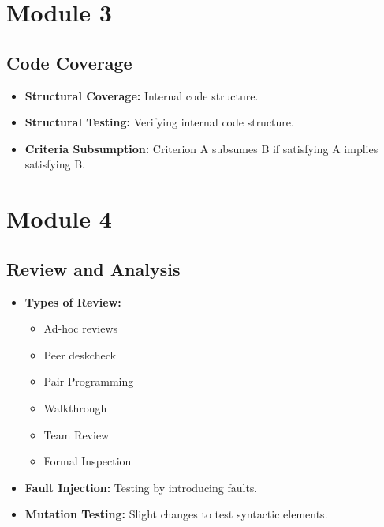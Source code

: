 \documentclass[10pt,portrait]{article}
\begin{document}
\begin{multicols}{ 2 }
\section*{Module 3}

\subsection*{Code Coverage}
\begin{itemize}
    \item \textbf{Structural Coverage:} Internal code structure.
    \item \textbf{Structural Testing:} Verifying internal code structure.
    \item \textbf{Criteria Subsumption:} Criterion A subsumes B if satisfying A implies satisfying B.
\end{itemize}

\section*{Module 4}

\subsection*{Review and Analysis}
\begin{itemize}
    \item \textbf{Types of Review:}
    \begin{itemize}
        \item Ad-hoc reviews
        \item Peer deskcheck
        \item Pair Programming
        \item Walkthrough
        \item Team Review
        \item Formal Inspection
    \end{itemize}
    \item \textbf{Fault Injection:} Testing by introducing faults.
    \item \textbf{Mutation Testing:} Slight changes to test syntactic elements.
\end{itemize}
\end{multicols}
\end{document}
